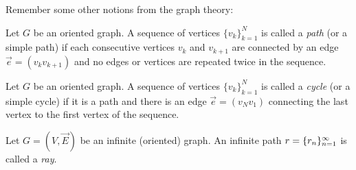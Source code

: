 \documentclass[12pt]{article}
\begin{document}
    Remember some other notions from the graph theory:
    \begin{definition}
      Let $G$ be an oriented graph.
      A sequence of vertices $\{v_k\}_{k=1}^N$ is called a \emph{path} (or a simple path) if each consecutive vertices
        $v_k$ and $v_{k+1}$ are connected by an edge $\vec{e} = (v_k v_{k+1})$ and no edges or vertices are repeated twice in the sequence.
    \end{definition}
    \begin{definition}
      Let $G$ be an oriented graph.
      A sequence of vertices $\{v_k\}_{k=1}^N$ is called a \emph{cycle} (or a simple cycle) if it is
        a path and there is an edge $\vec{e} = (v_N v_1)$ connecting the last vertex to the first vertex of the sequence.
    \end{definition}
    \begin{definition}
      Let $G = (V, \vec{E})$ be an infinite (oriented) graph.
      An infinite path $r = \{{r}_n\}_{n=1}^\infty$ is called a \emph{ray}.
    \end{definition}
\end{document}
